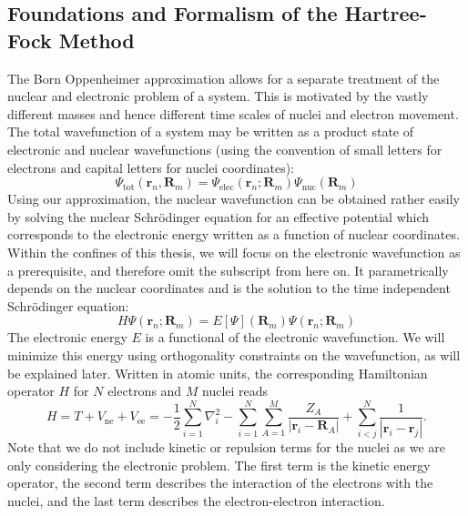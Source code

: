 \subsection{Foundations and Formalism of the Hartree-Fock Method}
\label{subsec:background_hf}
The Born Oppenheimer approximation allows for a separate treatment of the nuclear and electronic problem of a system. This is motivated by the vastly different masses and hence different time scales of nuclei and electron movement. The total wavefunction of a system may be written as a product state of electronic and nuclear wavefunctions (using the convention of small letters for electrons and capital letters for nuclei coordinates):
\begin{equation}
    \Psi_{\text{tot}}(\mathbf{r}_n, \mathbf{R}_m) = \Psi_{\text{elec}}(\mathbf{r}_n; \mathbf{R}_m) \Psi_{\text{nuc}}(\mathbf{R}_m)
\end{equation}
Using our approximation, the nuclear wavefunction can be obtained rather easily by solving the nuclear Schrödinger equation for an effective potential which corresponds to the electronic energy written as a function of nuclear coordinates.  
Within the confines of this thesis, we will focus on the electronic wavefunction as a prerequisite, and therefore omit the subscript from here on. It parametrically depends on the nuclear coordinates and is the solution to the time independent Schrödinger equation:
\begin{equation}
    H \Psi(\mathbf{r}_n; \mathbf{R}_m) = E[\Psi](\mathbf{R}_m) \Psi(\mathbf{r}_n; \mathbf{R}_m)
\end{equation}
The electronic energy $E$ is a functional of the electronic wavefunction. We will minimize this energy using orthogonality constraints on the wavefunction, as will be explained later. Written in atomic units, the corresponding Hamiltonian operator $H$ for $N$ electrons and $M$ nuclei reads
\begin{equation}
    H = T + V_{\text{ne}} + V_{\text{ee}} = -\frac{1}{2} \sum_{i=1}^N \nabla_i^2 - \sum_{i=1}^N \sum_{A=1}^M \frac{Z_A}{|\mathbf{r}_i - \mathbf{R}_A|} + \sum_{i<j}^N \frac{1}{|\mathbf{r}_i - \mathbf{r}_j|}.
\end{equation}
Note that we do not include kinetic or repulsion terms for the nuclei as we are only considering the electronic problem. The first term is the kinetic energy operator, the second term describes the interaction of the electrons with the nuclei, and the last term describes the electron-electron interaction.

